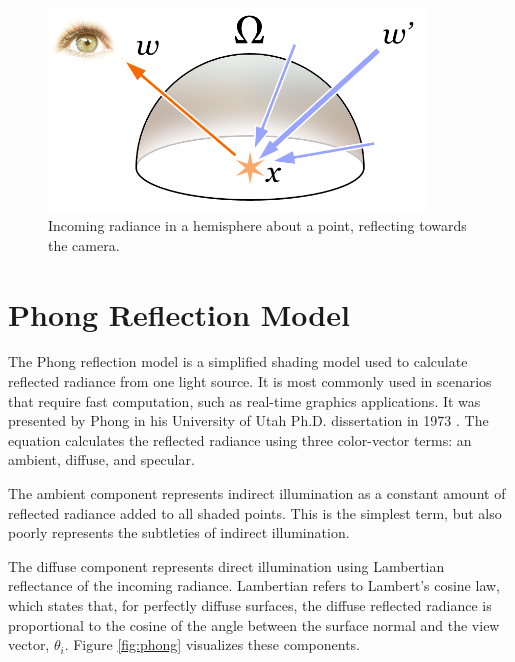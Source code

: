 \begin{figure}
   \centering
   \includegraphics[width=100mm]{../img/rendering-equation-image.png}
   \captionfonts
   \caption[Incoming radiance hemisphere]{Incoming radiance in a hemisphere about a point, reflecting towards the camera. \cite{bib:nikishin_radiance}}
   \label{fig:incoming_radiance}
\end{figure}

\section{Phong Reflection Model}
\label{sec:phong_model}

The Phong reflection model is a simplified shading model used to calculate reflected radiance from one light source. It is most commonly used in scenarios that require fast computation, such as real-time graphics applications. It was presented by Phong in his University of Utah Ph.D. dissertation in 1973 \cite{bib:phong_thesis}. The equation calculates the reflected radiance using three color-vector terms: an ambient, diffuse, and specular.

The ambient component represents indirect illumination as a constant amount of reflected radiance added to all shaded points. This is the simplest term, but also poorly represents the subtleties of indirect illumination.

The diffuse component represents direct illumination using Lambertian reflectance of the incoming radiance. Lambertian refers to Lambert's cosine law, which states that, for perfectly diffuse surfaces, the diffuse reflected radiance is proportional to the cosine of the angle between the surface normal and the view vector, $\theta_{i}$. Figure \ref{fig:phong} visualizes these components.

